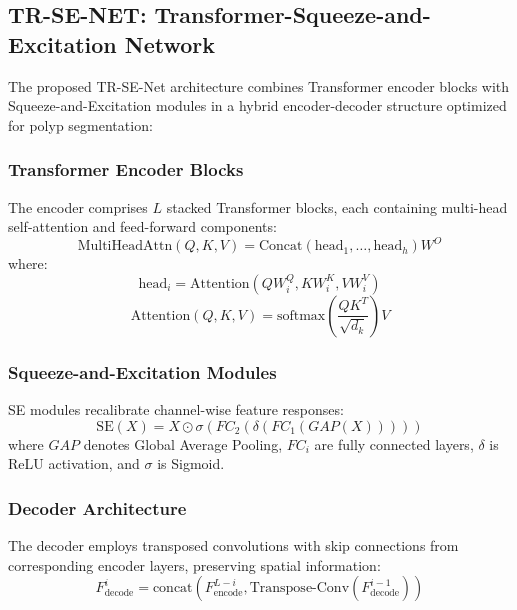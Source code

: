 \documentclass[11pt,a4paper]{article}
\begin{document}
\subsection{TR-SE-NET: Transformer-Squeeze-and-Excitation Network}

The proposed TR-SE-Net architecture combines Transformer encoder blocks with Squeeze-and-Excitation modules in a hybrid encoder-decoder structure optimized for polyp segmentation:

\subsubsection{Transformer Encoder Blocks}
The encoder comprises $L$ stacked Transformer blocks, each containing multi-head self-attention and feed-forward components:
\begin{equation}
\text{MultiHeadAttn}(Q, K, V) = \text{Concat}(\text{head}_1, \ldots, \text{head}_h)W^O
\end{equation}
where:
\begin{equation}
\text{head}_i = \text{Attention}(QW_i^Q, KW_i^K, VW_i^V)
\end{equation}
\begin{equation}
\text{Attention}(Q, K, V) = \text{softmax}\left(\frac{QK^T}{\sqrt{d_k}}\right)V
\end{equation}

\subsubsection{Squeeze-and-Excitation Modules}
SE modules recalibrate channel-wise feature responses:
\begin{equation}
\text{SE}(X) = X \odot \sigma(FC_2(\delta(FC_1(GAP(X)))))
\end{equation}
where $GAP$ denotes Global Average Pooling, $FC_i$ are fully connected layers, $\delta$ is ReLU activation, and $\sigma$ is Sigmoid.

\subsubsection{Decoder Architecture}
The decoder employs transposed convolutions with skip connections from corresponding encoder layers, preserving spatial information:
\begin{equation}
F_{\text{decode}}^{i} = \text{concat}(F_{\text{encode}}^{L-i}, \text{Transpose-Conv}(F_{\text{decode}}^{i-1}))
\end{equation}
\end{document}
